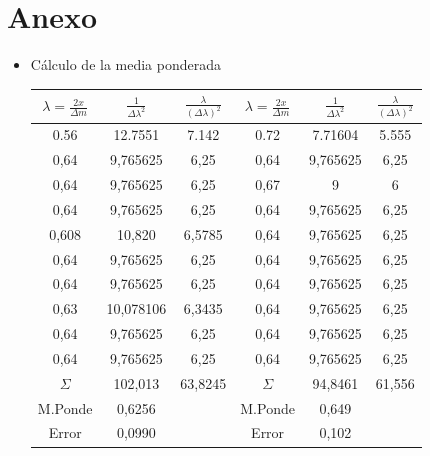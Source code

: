 \documentclass[11pt,letterpaper,twocolumn]{article}
\begin{document}
\section{Anexo}%
\begin{itemize}
    \item Cálculo de la media ponderada 
\begin{table}[H]
    \centering
    \begin{tabular}{|c|c|c|c|c|c|}
        \hline
        $\lambda=\frac{2x}{\Delta m}$ & $\frac{1}{\Delta \lambda ^2}$ & $\frac{\lambda}{\left( \Delta \lambda \right) ^2}$ & $\lambda =\frac{2x}{\Delta m}$ & $\frac{1}{\Delta \lambda ^2}$ & $ \frac{\lambda}{\left( \Delta \lambda  \right) ^2}$ \\ \hline
        0.56 & 12.7551 & 7.142 & 0.72 & 7.71604 & 5.555 \\ 
        0,64 & 9,765625 & 6,25 & 0,64 & 9,765625 & 6,25 \\
        0,64 & 9,765625 & 6,25 & 0,67 & 9 & 6 \\ 
        0,64 & 9,765625 & 6,25 & 0,64 & 9,765625 & 6,25 \\
        0,608 & 10,820 & 6,5785 & 0,64 & 9,765625 & 6,25 \\
        0,64 & 9,765625 & 6,25 & 0,64 & 9,765625 & 6,25 \\ 
        0,64 & 9,765625 & 6,25 & 0,64 & 9,765625 & 6,25 \\
        0,63 & 10,078106 & 6,3435 & 0,64 & 9,765625 & 6,25 \\
        0,64 & 9,765625 & 6,25 & 0,64 & 9,765625 & 6,25 \\
        0,64 & 9,765625 & 6,25 & 0,64 & 9,765625 & 6,25 \\ \hline
        $\Sigma$ & 102,013 & 63,8245 & $\Sigma$ & 94,8461 & 61,556 \\ \hline
        M.Ponde & 0,6256 &  & M.Ponde & 0,649 &  \\ \hline 
        Error & 0,0990 &  & Error & 0,102 &  \\ \hline
    \end{tabular}
    \label{}
\end{table}


\end{itemize}
\end{document}
